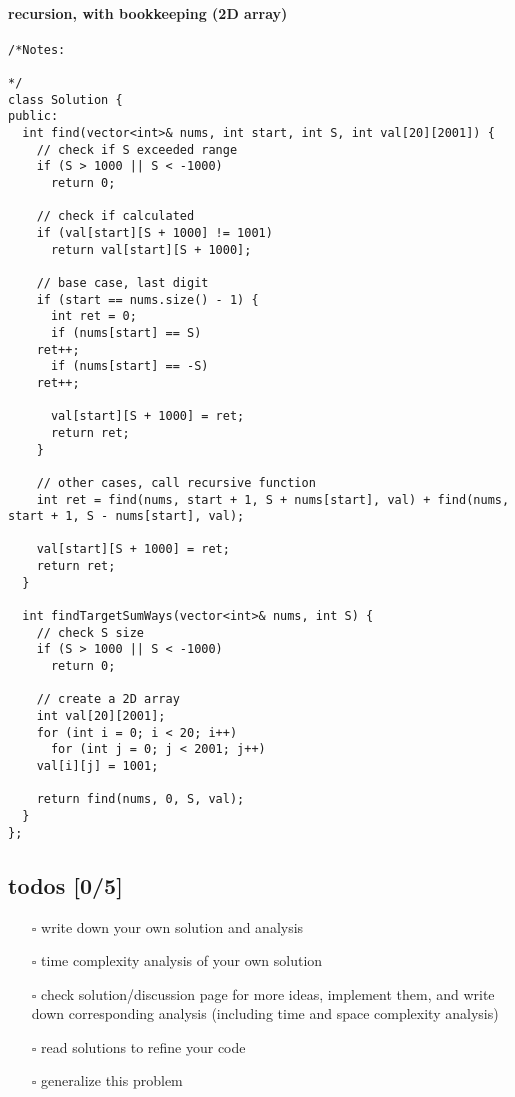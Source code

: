 \documentclass[12pt]{article}
\begin{document}
\paragraph{recursion, with bookkeeping (2D array)}
\label{sec:org1d69257}
\begin{verbatim}
/*Notes: 

*/
class Solution {
public:
  int find(vector<int>& nums, int start, int S, int val[20][2001]) {
    // check if S exceeded range
    if (S > 1000 || S < -1000)
      return 0;

    // check if calculated
    if (val[start][S + 1000] != 1001)
      return val[start][S + 1000];

    // base case, last digit 
    if (start == nums.size() - 1) {
      int ret = 0;
      if (nums[start] == S)
	ret++;
      if (nums[start] == -S)
	ret++;

      val[start][S + 1000] = ret;
      return ret;
    }

    // other cases, call recursive function
    int ret = find(nums, start + 1, S + nums[start], val) + find(nums, start + 1, S - nums[start], val);

    val[start][S + 1000] = ret;
    return ret;
  }

  int findTargetSumWays(vector<int>& nums, int S) {
    // check S size
    if (S > 1000 || S < -1000)
      return 0;

    // create a 2D array
    int val[20][2001];
    for (int i = 0; i < 20; i++)
      for (int j = 0; j < 2001; j++)
	val[i][j] = 1001;

    return find(nums, 0, S, val);
  }
};
\end{verbatim}

\subsection{todos [0/5]}
\label{sec:org9abcd6f}
\begin{itemize}
\item[{$\square$}] write down your own solution and analysis
\item[{$\square$}] time complexity analysis of your own solution
\item[{$\square$}] check solution/discussion page for more ideas, implement them, and write down corresponding analysis (including time and space complexity analysis)
\item[{$\square$}] read solutions to refine your code
\item[{$\square$}] generalize this problem
\end{itemize}
\end{document}
